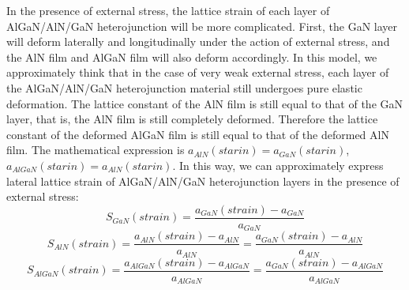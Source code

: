 In the presence of external stress, the lattice strain of each layer of  AlGaN/AlN/GaN heterojunction will be more complicated. First, the GaN layer will deform laterally and longitudinally under the action of external stress, and the AlN film and AlGaN film will also deform accordingly. In this model, we approximately think that in the case of very weak external stress, each layer of the AlGaN/AlN/GaN heterojunction material still undergoes pure  elastic  deformation. The lattice constant  of the AlN film is still equal to that of the GaN layer, that is, the AlN film is still completely deformed. Therefore the lattice constant  of the deformed AlGaN film is still equal to that of the deformed AlN film. The mathematical expression is $a_{AlN}(starin)=a_{GaN}(starin)$, $a_{AlGaN}(starin)=a_{AlN}(starin)$. In this way, we can approximately express lateral lattice strain  of AlGaN/AlN/GaN heterojunction layers in the presence of external stress:
\begin{equation}
S_{G a N}(strain)=\frac{a_{G a N}(strain)-a_{G a N}}{a_{G a N}}
\label{eq:2.16}
\end{equation}
\begin{equation}
S_{A l N}(strain)=\frac{a_{A l N}(strain)-a_{A l N}}{a_{A l N}}=\frac{a_{G a N}(strain)-a_{A l N}}{a_{A l N}}
\label{eq:2.17}
\end{equation}
\begin{equation}
S_{AlGaN }(strain)=\frac{a_{A l G a N}(strain)-a_{A l G a N}}{a_{A l G a N}}=\frac{a_{G a N}(strain)-a_{A l G a N}}{a_{A l G a N}}
\label{eq:2.18}
\end{equation}

